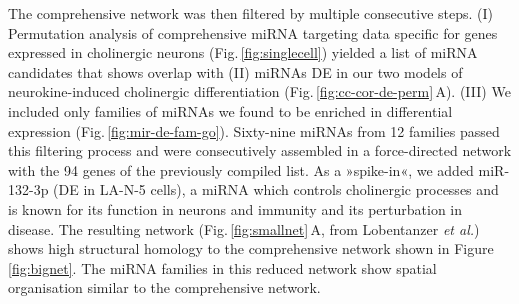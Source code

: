 The comprehensive network was then filtered by multiple consecutive steps. (I) Permutation analysis of comprehensive miRNA targeting data specific for genes expressed in cholinergic neurons (Fig.\,\ref{fig:singlecell}) yielded a list of miRNA candidates that shows overlap with (II) miRNAs DE in our two models of neurokine-induced cholinergic differentiation (Fig.\,\ref{fig:cc-cor-de-perm}\,A). (III) We included only families of miRNAs we found to be enriched in differential expression (Fig.\,\ref{fig:mir-de-fam-go}). Sixty-nine miRNAs from 12 families passed this filtering process and were consecutively assembled in a force-directed network with the 94 genes of the previously compiled list. As a »spike-in«, we added miR-132-3p (DE in LA-N-5 cells), a miRNA which controls cholinergic processes\cite{Shaltiel2013, Hanin2018} and is known for its function in neurons\cite{Mellios2011} and immunity\cite{Shaked2009} and its perturbation in disease.\cite{Pichler2017} The resulting network (Fig.\,\ref{fig:smallnet}\,A, from Lobentanzer \emph{et al.}\cite{Lobentanzer2019a}) shows high structural homology to the comprehensive network shown in Figure \ref{fig:bignet}. The miRNA families in this reduced network show spatial organisation similar to the comprehensive network. 

